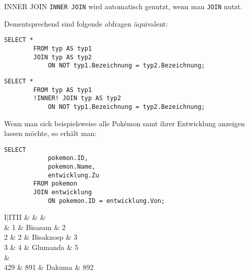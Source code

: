 \begin{sql}{INNER JOIN}
    \texttt{INNER JOIN} wird automatisch genutzt, wenn man \texttt{JOIN} nutzt.

    Dementsprechend sind folgende abfragen äquivalent:

    \begin{lstlisting}[language=mysql]
        SELECT *
        FROM typ AS typ1
        JOIN typ AS typ2
            ON NOT typ1.Bezeichnung = typ2.Bezeichnung;
    \end{lstlisting}

    \begin{lstlisting}[language=mysql]
        SELECT *
        FROM typ AS typ1
        !INNER! JOIN typ AS typ2
            ON NOT typ1.Bezeichnung = typ2.Bezeichnung;
    \end{lstlisting}

    Wenn man sich beispielsweise alle Pokémon samt ihrer Entwicklung anzeigen lassen möchte, so erhält man:

    \begin{lstlisting}[language=mysql]
        SELECT
            pokemon.ID,
            pokemon.Name,
            entwicklung.Zu
        FROM pokemon
        JOIN entwicklung
            ON pokemon.ID = entwicklung.Von;
    \end{lstlisting}

    \setcounter{rownum}{0}
    \begin{tabular}{I|ITII}
                                   &     &  &  \\                          & 1                         & Bisasam                  & 2                      \\
        2                          & 2                         & Bisaknosp                & 3                      \\
        3                          & 4                         & Glumanda                 & 5                      \\
         &                                                      \\
        429                        & 891                       & Dakuma                   & 892                    \\
    \end{tabular}
\end{sql}

